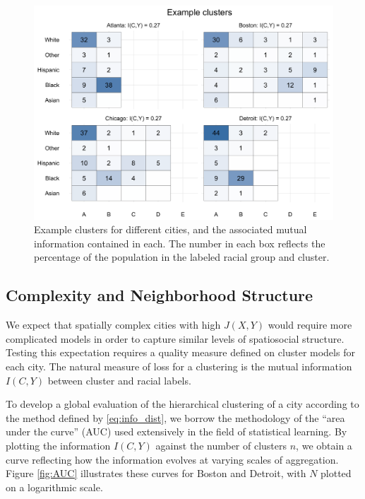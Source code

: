 	\begin{figure}
		\centering
		\includegraphics[width=\textwidth]{figs/example_clusters.png}
		\caption{Example clusters for different cities, and the associated mutual information contained in each. The number in each box reflects the percentage of the population in the labeled racial group and cluster. }
		\label{fig:clusters}
	\end{figure}

\subsection{Complexity and Neighborhood Structure}

	We expect that spatially complex cities with high $J(X,Y)$ would require more complicated models in order to capture similar levels of spatiosocial structure. Testing this expectation requires a quality measure defined on cluster models for each city. The natural measure of loss for a clustering is the mutual information $I(C,Y)$ between cluster and racial labels.
		
	To develop a global evaluation of the hierarchical clustering of a city according to the method defined by \eqref{eq:info_dist}, we borrow the methodology of the ``area under the curve'' (AUC) used extensively in the field of statistical learning. By plotting the information $I(C,Y)$ against the number of clusters $n$, we obtain a curve reflecting how the information evolves at varying scales of aggregation. Figure \ref{fig:AUC} illustrates these curves for Boston and Detroit, with $N$ plotted on a logarithmic scale.  

